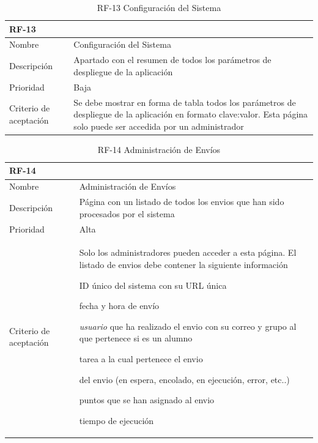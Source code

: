 \documentclass[11pt,spanish,listoffigures,listoftables]{tfgetsinf}
\begin{document}
\begin{table}[ht!]
	\centering
	\begin{tabular}{ |p{4cm}||p{10cm}|  }
		\multicolumn{2}{l}{\textbf{RF-13}} \\
		\hline
		Nombre & Configuración del Sistema \\
		\hline
		Descripción & Apartado con el resumen de todos los parámetros de despliegue de la aplicación \\
		\hline
		Prioridad & Baja\\
		\hline
		Criterio de aceptación & Se debe mostrar en forma de tabla todos los parámetros de despliegue de la aplicación en formato clave:valor. Esta página solo puede ser accedida por un \gls{administrador} \\
		\hline
	\end{tabular}
	\caption{RF-13 Configuración del Sistema \\}
	\label{table:13}
\end{table}

\begin{table}[ht!]
	\centering
	\begin{tabular}{ |p{4cm}||p{10cm}|  }
		\multicolumn{2}{l}{\textbf{RF-14}} \\
		\hline
		Nombre & Administración de Envíos \\
		\hline
		Descripción & Página con un listado de todos los \gls{envio}s que han sido procesados por el sistema \\
		\hline
		Prioridad & Alta\\
		\hline
		Criterio de aceptación & Solo los \gls{administrador}es pueden acceder a esta página. \newline 
		El listado de \gls{envio}s debe contener la siguiente información \newline
		\begin{tabitem}
			\item ID único del sistema con su URL única
			\item fecha y hora de envío
			\item \textit{usuario} que ha realizado el \gls{envio} con su correo y grupo al que pertenece si es un \gls{alumno}
			\item \gls{tarea} a la cual pertenece el \gls{envio}
			\item \foreign{english}{status} del \gls{envio} (en espera, encolado, en ejecución, error, etc..)
			\item puntos que se han asignado al \gls{envio}
			\item tiempo de ejecución
		\end{tabitem} \\
		\hline
	\end{tabular}
	\caption{RF-14 Administración de Envíos}
	\label{table:14}
\end{table}
\end{document}
